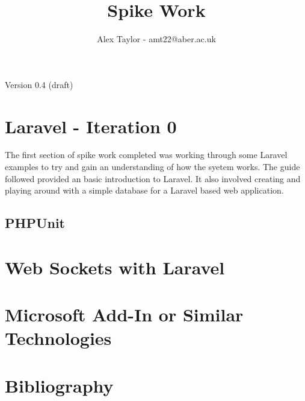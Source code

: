\documentclass{article}
\title{Spike Work}
\author{Alex Taylor - amt22@aber.ac.uk}
\begin{document}
\maketitle
\begin{center}
	Version 0.4 (draft)
\end{center}
\tableofcontents
\thispagestyle{empty}
\newpage

\section{Laravel - Iteration 0}
The first section of spike work completed was working through some Laravel examples to try and gain an understanding of how the syetem works. The guide\cite{Laravel5Guide} followed provided an basic introduction to Laravel. It also involved creating and playing around with a simple database for a Laravel based web application.
\subsection{PHPUnit}
\newpage

\section{Web Sockets with Laravel}
\newpage

\section{Microsoft Add-In or Similar Technologies}
\newpage

\section{Bibliography}


\end{document}

